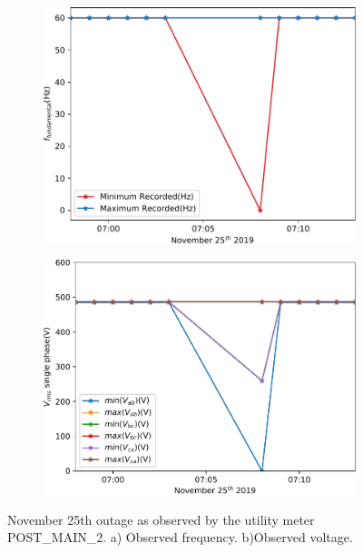 \begin{figure}[h]
    \centering
    \begin{subfigure}{.45\textwidth}
        \centering
        \includegraphics[width=1\linewidth]{img/napali_eval/gt/outage_f.pdf}
        \caption{}
        \label{expdes:fig:gt_outage:f}
    \end{subfigure}\hspace{5mm}
    \begin{subfigure}{.45\textwidth}
        \centering
        \includegraphics[width=1\linewidth]{img/napali_eval/gt/outage_v.pdf}
        \caption{}
        \label{expdes:fig:gt_outage:v}
    \end{subfigure}

    \caption{November 25th outage as observed by the utility meter POST\_MAIN\_2.
    a) Observed frequency.
    b)Observed voltage.}

    \label{expdes:fig:gt_outage}
\end{figure}

